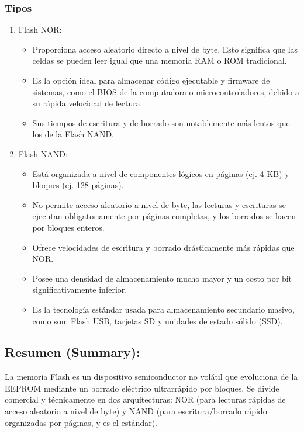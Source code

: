 \documentclass{article}
\begin{document}
\subsubsection{Tipos}
\label{sec:org9112171}
\begin{enumerate}
\item Flash NOR:
\label{sec:orgbf4ecff}
\begin{itemize}
\item Proporciona acceso aleatorio directo a nivel de byte. Esto
significa que las celdas se pueden leer igual que una memoria RAM o
ROM tradicional.
\item Es la opción ideal para almacenar código ejecutable y firmware de
sistemas, como el BIOS de la computadora o microcontroladores,
debido a su rápida velocidad de lectura.
\item Sus tiempos de escritura y de borrado son notablemente más lentos
que los de la Flash NAND.
\end{itemize}
\item Flash NAND:
\label{sec:org3f4e64f}
\begin{itemize}
\item Está organizada a nivel de componentes lógicos en páginas (ej. 4 KB)
y bloques (ej. 128 páginas).
\item No permite acceso aleatorio a nivel de byte, las lecturas y
escrituras se ejecutan obligatoriamente por páginas completas, y los
borrados se hacen por bloques enteros.
\item Ofrece velocidades de escritura y borrado drásticamente más rápidas
que NOR.
\item Posee una densidad de almacenamiento mucho mayor y un costo por bit
significativamente inferior.
\item Es la tecnología estándar usada para almacenamiento secundario
masivo, como son: Flash USB, tarjetas SD y unidades de estado sólido
(SSD).
\end{itemize}
\end{enumerate}

\subsection{Resumen (Summary):}
\label{sec:orgc3afb2d}
La memoria Flash es un dispositivo semiconductor no volátil que
evoluciona de la EEPROM mediante un borrado eléctrico ultrarrápido por
bloques. Se divide comercial y técnicamente en dos arquitecturas: NOR
(para lecturas rápidas de acceso aleatorio a nivel de byte) y NAND
(para escritura/borrado rápido organizadas por páginas, y es el
estándar).
\end{document}
